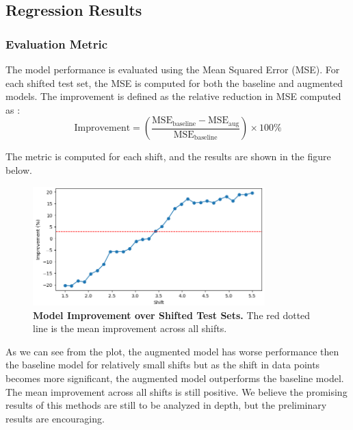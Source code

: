 \subsection{Regression Results}

\subsubsection{Evaluation Metric}
The model performance is evaluated using the Mean Squared Error (MSE). For each shifted test set, the MSE is computed for both the baseline and augmented models.
The improvement is defined as the relative reduction in MSE computed as :
\begin{equation}
    \text{Improvement} = \left(\frac{\text{MSE}_{\text{baseline}} - \text{MSE}_{\text{aug}}}{\text{MSE}_{\text{baseline}}}\right) \times 100\%
\end{equation}

The metric is computed for each shift, and the results are shown in the figure below.
\begin{figure}[H]
    \centering
    \includegraphics[width=0.8\textwidth]{assets/reg_exp_improvement.png} 
    \caption{\textbf{Model Improvement over Shifted Test Sets.} The red dotted line is the mean improvement across all shifts.}
    \label{fig:improv-plot}
\end{figure}

As we can see from the plot, the augmented model has worse performance then the baseline model for relatively small shifts but as the shift in data points becomes more significant, the augmented model outperforms the baseline model. The mean improvement across all shifts is still positive.
We believe the promising results of this methods are still to be analyzed in depth, but the preliminary results are encouraging.

